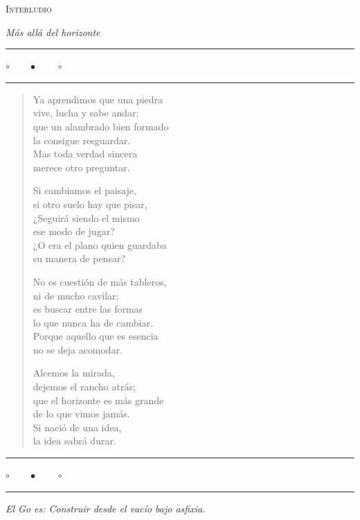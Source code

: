 \thispagestyle{empty}
\begin{center}
	{\Large\scshape Interludio}
	
	\vspace{0.2cm}
	
	{\itshape Más allá del horizonte}
	
	\rule{0.32\textwidth}{0.3pt}
	
	\vspace{0.2cm}
	
	$\circ\qquad\bullet\qquad\circ$
	
	\vspace{0.2cm}
	
	\rule{0.4\textwidth}{0.3pt}
	
	\begin{center}
		\begin{minipage}[t]{0.52\textwidth} 
			\begin{verse}
				Ya aprendimos que una piedra\\
				vive, lucha y sabe andar;\\
				que un alambrado bien formado\\
				la consigue resguardar.\\
				Mas toda verdad sincera\\
				merece otro preguntar.
				
				Si cambiamos el paisaje,\\
				si otro suelo hay que pisar,\\
				¿Seguirá siendo el mismo\\
				ese modo de jugar?\\
				¿O era el plano quien guardaba\\
				su manera de pensar?
				
				No es cuestión de más tableros,\\
				ni de mucho cavilar;\\
				es buscar entre las formas\\
				lo que nunca ha de cambiar.\\
				Porque aquello que es esencia\\
				no se deja acomodar.
				
				Alcemos la mirada,\\
				dejemos el rancho atrás;\\
				que el horizonte es más grande\\
				de lo que vimos jamás.\\
				Si nació de una idea,\\
				la idea sabrá durar.
			\end{verse} 
		\end{minipage}
	\end{center}
	
	\rule{0.4\textwidth}{0.3pt}
	
	\vspace{0.2cm}
	
	$\circ\qquad\bullet\qquad\circ$
	
	\vspace{0.2cm}
	
	\rule{0.32\textwidth}{0.3pt}
	
\end{center}
\vfill
\emph{El Go es:	Construir desde el vacío
	bajo asfixia.}